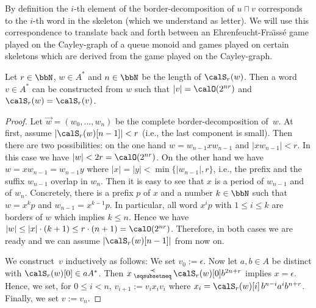 By definition the $i$-th element of the border-decomposition of $u\sqcap v$ corresponds to the $i$-th word in the skeleton (which we understand as letter). We will use this correspondence to translate back and forth between 
an Ehrenfeucht-Fra\"{\i}ss\'{e} game played on the Cayley-graph of a queue monoid and games played on certain skeletons which are derived from the game played on the Cayley-graph. 

\begin{lemma}\label{lem:short_from_skeleton}
	Let $r\in\bbN$, $w\in A^*$ and $n\in\bbN$ be the length of $\calS_r(w)$. Then a word $v\in A^*$ can be constructed from $w$ such that $|v|=\calO(2^{nr})$ and $\calS_r(w)=\calS_r(v)$.
\end{lemma}
\begin{proof}
	Let $\vec{w}=(w_0,\dots,w_n)$ be the complete border-decomposition of~$w$. At first, assume $|\calS_r(w)[n-1]|<r$ (i.e., the last component is small). Then there are two possibilities: on the one hand $w=w_{n-1}xw_{n-1}$ and $|xw_{n-1}|<r$. In this case we have $|w|<2r=\calO(2^{nr})$. On the other hand we have $w=xw_{n-1}=w_{n-1}y$ where $|x|=|y|<\min\{|w_{n-1}|,r\}$, i.e., the prefix and the suffix $w_{n-1}$ overlap in $w_n$. Then it is easy to see that $x$ is a period of $w_{n-1}$ and of $w_n$. Concretely, there is a prefix $p$ of $x$ and a number $k\in\bbN$ such that $w=x^kp$ and $w_{n-1}=x^{k-1}p$. In particular, all word $x^ip$ with $1\leq i\leq k$ are borders of $w$ which implies $k\leq n$. Hence we have $|w|\leq|x|\cdot(k+1)\leq r\cdot(n+1)=\calO(2^{nr})$. Therefore, in both cases we are ready and we can assume $|\calS_r(w)[n-1]|$ from now on.
	
	We construct~$v$ inductively as follows: We set $v_0:=\epsilon$. Now let $a,b\in A$ be distinct with $\calS_r(w)[0]\in aA^*$. Then $x\presuf\calS_r(w)[0]b^{2n+r}$ implies $x=\epsilon$. Hence, we set, for $0\leq i<n$, $v_{i+1}:=v_ix_iv_i$ where $x_i=\calS_r(w)[i]\,b^{n-i}a^ib^{n+r}$. Finally, we set $v:=v_{n}$.
	

\end{proof}
